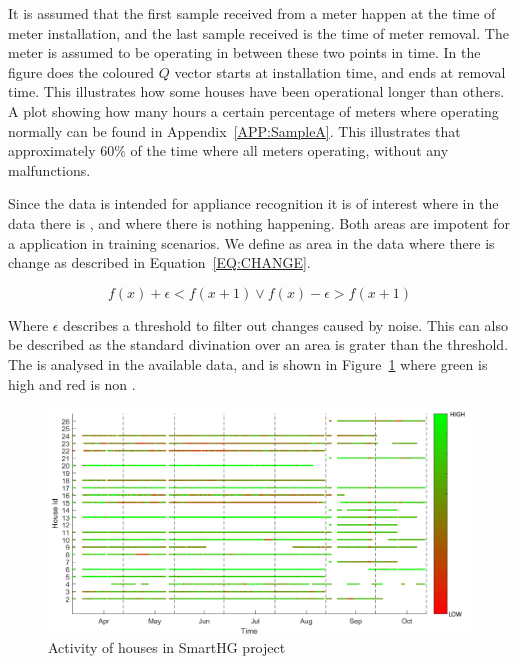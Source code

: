 It is assumed that the first sample received from a meter happen at the time of meter installation, and the last sample received is the time of meter removal. The meter is assumed to be operating in between these two points in time. In the figure does the coloured $Q$ vector starts at installation time, and ends at removal time. This illustrates how some houses have been operational longer than others. A plot showing how many hours a certain percentage of meters where operating normally can be found in Appendix~\ref{APP:SampleA}. This illustrates that approximately 60\% of the time where all meters operating, without any malfunctions.

Since the data is intended for appliance recognition it is of interest where in the data there is , and where there is nothing happening. Both areas are impotent for a  application in training scenarios. We define  as area in the data where there is change as described in Equation~\ref{EQ:CHANGE}.

\begin{equation}
f(x) + \epsilon < f(x+1) \vee f(x) - \epsilon > f(x+1)
\label{EQ:CHANGE}
\end{equation}

Where $\epsilon$ describes a threshold to filter out changes caused by noise. This can also be described as the standard divination over an area is grater than the threshold. The  is analysed in the available data, and is shown in Figure~\ref{fig:ActivityMap} where green is high  and red is non . 

\begin{figure}[H]
\centering
\includegraphics[width=1\textwidth]{billeder/ActivityBig.png}
\caption{Activity of houses in SmartHG project}
\label{fig:ActivityMap}
\end{figure}

